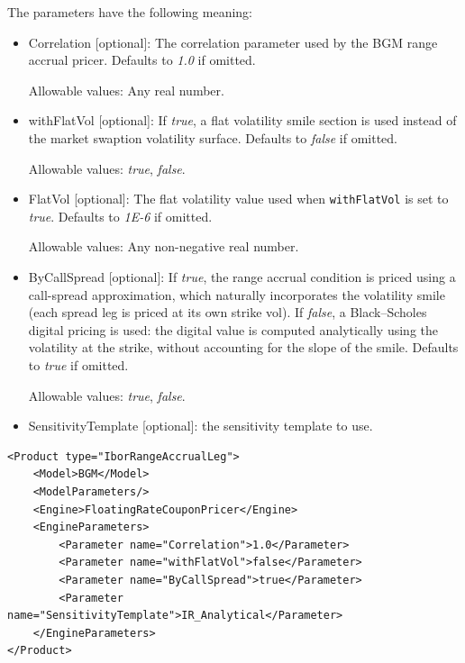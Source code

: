 The parameters have the following meaning:

\begin{itemize}
\item Correlation [optional]: The correlation parameter used by the BGM range accrual pricer. Defaults to \emph{1.0} if
  omitted.

  Allowable values: Any real number.

\item withFlatVol [optional]: If \emph{true}, a flat volatility smile section is used instead of the market swaption
  volatility surface. Defaults to \emph{false} if omitted.

  Allowable values: \emph{true}, \emph{false}.

\item FlatVol [optional]: The flat volatility value used when \lstinline!withFlatVol! is set to \emph{true}. Defaults to
  \emph{1E-6} if omitted.

  Allowable values: Any non-negative real number.

\item ByCallSpread [optional]: If \emph{true}, the range accrual condition is priced using a call-spread approximation,
  which naturally incorporates the volatility smile (each spread leg is priced at its own strike vol).
  If \emph{false}, a Black--Scholes digital pricing is used: the digital value is computed analytically using the
  volatility at the strike, without accounting for the slope of the smile. Defaults to \emph{true} if omitted.

  Allowable values: \emph{true}, \emph{false}.

\item SensitivityTemplate [optional]: the sensitivity template to use.
\end{itemize}

\begin{longlisting}
\begin{verbatim}
<Product type="IborRangeAccrualLeg">
    <Model>BGM</Model>
    <ModelParameters/>
    <Engine>FloatingRateCouponPricer</Engine>
    <EngineParameters>
        <Parameter name="Correlation">1.0</Parameter>
        <Parameter name="withFlatVol">false</Parameter>
        <Parameter name="ByCallSpread">true</Parameter>
        <Parameter name="SensitivityTemplate">IR_Analytical</Parameter>
    </EngineParameters>
</Product>
\end{verbatim}
\caption{Configuration for Product IborRangeAccrualLeg, Model BGM, Engine FloatingRateCouponPricer}
\label{lst:peconfig_IborRangeAccrualLeg_BGM_FloatingRateCouponPricer}
\end{longlisting}

